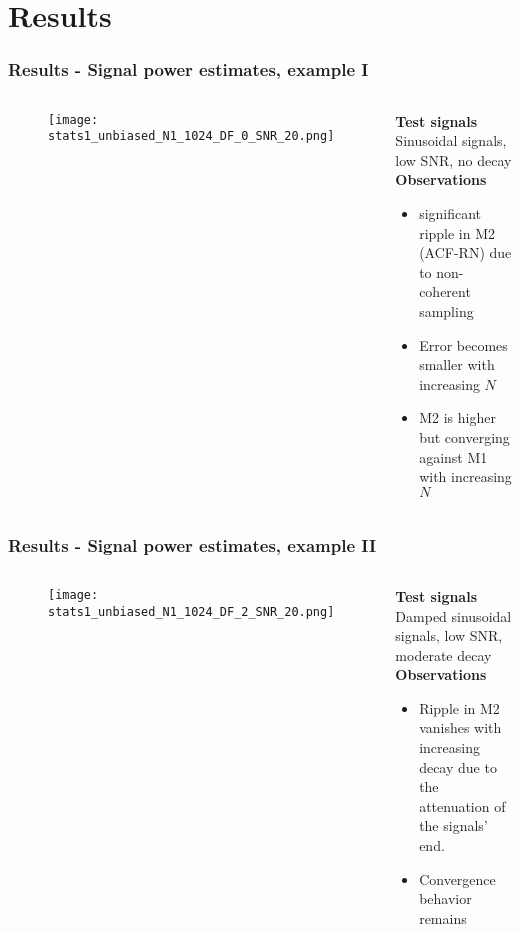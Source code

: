 \documentclass[11pt,aspectratio=169]{beamer}
\begin{document}
	\section{Results}
	\begin{frame}
		\frametitle{Results - Signal power estimates, example I}
		\begin{columns}[t]
			\begin{RIPcolleft}
				\begin{figure}
					\texttt{[image: stats1\_unbiased\_N1\_1024\_DF\_0\_SNR\_20.png]}
				\end{figure}
			\end{RIPcolleft}
			\begin{RIPcolright}
				\textbf{Test signals}\\
				Sinusoidal signals, low SNR, no decay\\
				\vspace*{.5em}
				\textbf{Observations}\\
				\begin{itemize}
					\item significant ripple in M2 (ACF-RN) due to non-coherent sampling
					\item Error becomes smaller with increasing $N$
					\item M2 is higher but converging against M1 with increasing $N$
				\end{itemize}
			\end{RIPcolright}
		\end{columns}
	\end{frame}
	\begin{frame}
		\frametitle{Results - Signal power estimates, example II}
		\begin{columns}[t]
			\begin{RIPcolleft}
				\begin{figure}
					\texttt{[image: stats1\_unbiased\_N1\_1024\_DF\_2\_SNR\_20.png]}
				\end{figure}
			\end{RIPcolleft}
			\begin{RIPcolright}
				\textbf{Test signals}\\
				Damped sinusoidal signals, low SNR, moderate decay\\
				\vspace*{.5em}
				\textbf{Observations}\\
				\begin{itemize}
					\item Ripple in M2 vanishes with increasing decay due to the attenuation of the signals' end.
					\item Convergence behavior remains
				\end{itemize}
			\end{RIPcolright}
		\end{columns}
	\end{frame}
\end{document}
